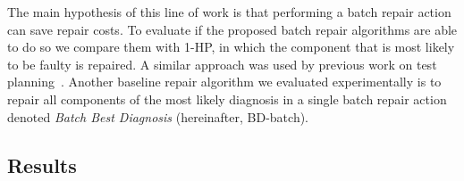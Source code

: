 \documentclass[review]{elsarticle}
\begin{document}
The main hypothesis of this line of work is that performing a batch repair action can save repair costs. To evaluate if the proposed batch repair algorithms are able to do so we compare them with 1-HP, in which the component that is most likely to be faulty is repaired. A similar approach was used by previous work on test planning~\cite{zamir2014using}. Another baseline repair algorithm we evaluated experimentally is to repair all components of the most likely diagnosis in a single batch repair action denoted {\em Batch Best Diagnosis} (hereinafter, BD-batch).




\subsection{Results}
\end{document}

